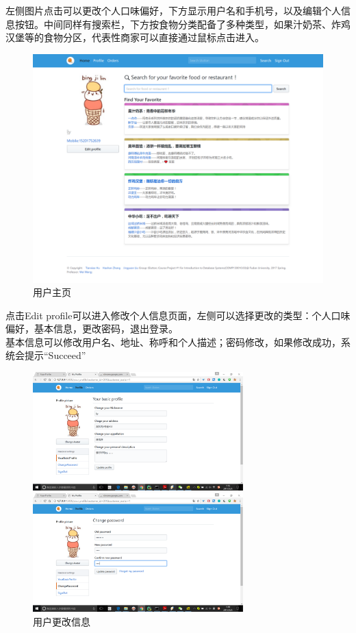 \documentclass[12pt, oneside,a4paper]{article}
\begin{document}
\begin{itemize}
  左侧图片点击可以更改个人口味偏好，下方显示用户名和手机号，以及编辑个人信息按钮。中间同样有搜索栏，下方按食物分类配备了多种类型，如果汁奶茶、炸鸡汉堡等的食物分区，代表性商家可以直接通过鼠标点击进入。
  \begin{figure}[H]
   \centering
     \includegraphics[width=6.00in]{cu-home.png}
     \caption{\small{用户主页}}
  \end{figure}
  点击Edit profile可以进入修改个人信息页面，左侧可以选择更改的类型：个人口味偏好，基本信息，更改密码，退出登录。\\
  基本信息可以修改用户名、地址、称呼和个人描述；密码修改，如果修改成功，系统会提示“Succeed”
  \begin{figure}[H]
   \begin{minipage}[t]{0.5\linewidth}
    \centering
     \includegraphics[width=3.2in]{cu-profile.jpg}
     \caption{\small{用户更改信息}}
   \end{minipage}
   \begin{minipage}[t]{0.5\linewidth}
    \centering
     \includegraphics[width=3.2in]{cu-password.jpg}

\end{minipage}
\end{figure}
\end{itemize}
\end{document}

